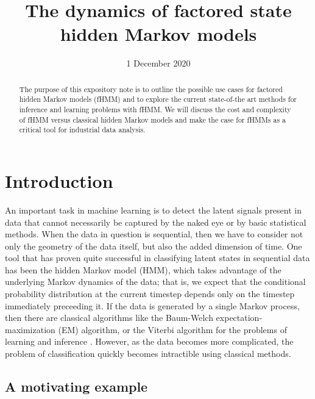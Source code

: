 \documentclass{article}
\title{The dynamics of factored state hidden Markov models}
\date{1 December 2020}
\begin{document}
\maketitle

\begin{abstract}
The purpose of this expository note is to outline the possible use cases for factored hidden Markov models (fHMM) and to explore the current state-of-the art methods for inference and learning problems with fHMM.  We will discuss the cost and complexity of fHMM versus classical hidden Markov models and make the case for fHMMs as a critical tool for industrial data analysis.  
\end{abstract}

\section{Introduction}
An important task in machine learning is to detect the latent signals present in data that cannot necessarily be captured by the naked eye or by basic statistical methods.  When the data in question is sequential, then we have to consider not only the geometry of the data itself, but also the added dimension of time.  One tool that has proven quite successful in classifying latent states in sequential data has been the hidden Markov model (HMM), which takes advantage of the underlying Markov dynamics of the data; that is, we expect that the conditional probability distribution at the current timestep depends only on the timestep immediately preceeding it. If the data is generated by a single Markov process, then there are classical algorithms like the Baum-Welch expectation-maximization (EM) algorithm, or the Viterbi algorithm for the problems of learning and inference \cite{G01}.  However, as the data becomes more complicated, the problem of classification quickly becomes intractible using classical methods.

\subsection{A motivating example}
\end{document}
